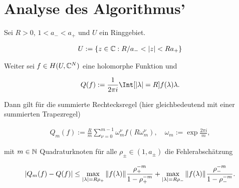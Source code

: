 \section{Analyse des Algorithmus'}

\begin{lemma}

    Sei $R > 0$, $1 < a_- < a_+$ und $U$ ein Ringgebiet.

    \begin{align*}
        U := {\left \{ z \in \mathbb{C}: R / a_- < {\left | z \right |} < R a_+ \right \}}
    \end{align*}

    Weiter sei $f \in H(U, \mathbb{C}^N)$ eine holomorphe Funktion und

    \begin{align*}
        Q(f)
        :=
        \frac{1}{2 \pi i}
        \Int[\abs{\lambda} = R]{f(\lambda)}{\lambda}.
    \end{align*}

    Dann gilt für die summierte Rechtecksregel (hier gleichbedeutend mit einer summierten Trapezregel)

    \begin{align*}
        Q_m(f)
        :=
        \frac{R}{m}
        \sum_{\nu = 0}^{m - 1}
            \omega_m^\nu
            f(R \omega_m^\nu),
        \quad
        \omega_m
        :=
        \exp \frac{2 \pi i}{m},
    \end{align*}

    mit $m \in \mathbb{N}$ Quadraturknoten für alle $\rho_\pm \in (1, a_\pm)$ die Fehlerabschätzung

    \begin{align*}
        {\left | Q_m(f) - Q(f) \right |}
        \leq
        \max_{{\left | \lambda \right |} = R \rho_+}
            {\left \| f(\lambda) \right \|}_{}
        \frac{\rho_+^{-m}}{1 - \rho_+^{-m}}
        +
        \max_{{\left | \lambda \right |} = R \rho_-}
            {\left \| f(\lambda) \right \|}_{}
        \frac{\rho_-^{-m}}{1 - \rho_-^{-m}}.
    \end{align*}

\end{lemma}

